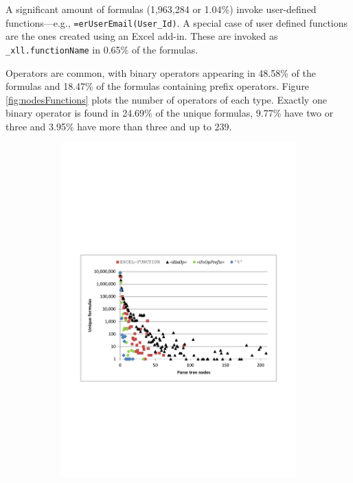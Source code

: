 \documentclass[times]{smrauth}
\begin{document}
A significant amount of formulas (1,963,284	or 1.04\%) invoke user-defined functions---e.g., \texttt{=erUserEmail(User_Id)}. A special case of user defined functions are the ones created using an Excel add-in. These are invoked as \texttt{_xll.functionName} in 0.65\% of the formulas.

Operators are common, with binary operators appearing in 48.58\% of the formulas and 18.47\% of the formulas containing prefix operators. Figure \ref{fig:nodesFunctions} plots the number of operators of each type. Exactly one binary operator is found in 24.69\% of the unique formulas, 9.77\% have two or three and 3.95\% have more than three and up to 239.

\begin{figure}
	\centering
	\begin{subfigure}[b]{0.49\textwidth}
		\centering
		\includegraphics[width=1\textwidth]{img/nodesFunctions}

\end{subfigure}
\end{figure}
\end{document}
